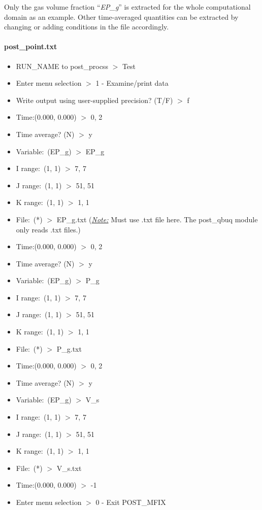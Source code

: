 \documentclass[a4paper,12pt,titlepage]{article}
\begin{document}
Only the gas volume fraction ``\emph{EP\_g}'' is extracted for the whole
computational domain as an example. Other time-averaged quantities can be
extracted by changing or adding conditions in the file accordingly.

\paragraph*{post\_point.txt}

\begin{itemize}
 \item RUN\_NAME to post\_procss $>$ Test
 \item Enter menu selection $>$ 1 - Examine/print data
 \item Write output using user-supplied precision? (T/F) $>$ f
 \item Time:(0.000, 0.000) $>$ 0, 2
 \item Time average? (N) $>$ y
 \item Variable:\ (EP\_g) $>$ EP\_g
 \item I range:\ (1, 1) $>$ 7, 7
 \item J range:\ (1, 1) $>$ 51, 51
 \item K range:\ (1, 1) $>$ 1, 1
 \item File:\ (*) $>$ EP\_g.txt (\emph{\underline{Note:}} Must use .txt 
 file here. The post\_qbuq module only reads .txt files.)
 \item Time:(0.000, 0.000) $>$ 0, 2
 \item Time average? (N) $>$ y
 \item Variable:\ (EP\_g) $>$ P\_g
 \item I range:\ (1, 1) $>$ 7, 7
 \item J range:\ (1, 1) $>$ 51, 51
 \item K range:\ (1, 1) $>$ 1, 1
 \item File:\ (*) $>$ P\_g.txt
 \item Time:(0.000, 0.000) $>$ 0, 2
 \item Time average? (N) $>$ y
 \item Variable:\ (EP\_g) $>$ V\_s
 \item I range:\ (1, 1) $>$ 7, 7
 \item J range:\ (1, 1) $>$ 51, 51
 \item K range:\ (1, 1) $>$ 1, 1
 \item File:\ (*) $>$ V\_s.txt 
 \item Time:(0.000, 0.000) $>$ -1
 \item Enter menu selection $>$ 0 - Exit POST\_MFIX
\end{itemize}
\end{document}

